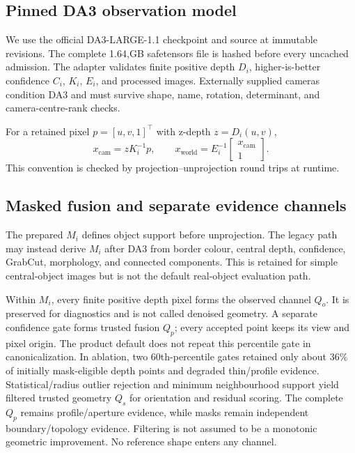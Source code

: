 \documentclass[10pt]{article}
\newcommand{\da}{DA3-LARGE-1.1}
\begin{document}
\subsection{Pinned DA3 observation model}

We use the official \da{} checkpoint and source at immutable revisions.  The
complete 1.64,GB safetensors file is hashed before every uncached admission.
The adapter validates finite positive depth $D_i$, higher-is-better confidence
$C_i$, $K_i$, $E_i$, and processed images.  Externally supplied cameras
condition DA3 and must survive shape, name, rotation, determinant, and
camera-centre-rank checks.

For a retained pixel $p=[u,v,1]^\top$ with z-depth $z=D_i(u,v)$,
\begin{equation}
  x_{\mathrm{cam}} = zK_i^{-1}p, \qquad
  x_{\mathrm{world}} = E_i^{-1}\begin{bmatrix}x_{\mathrm{cam}}\\1\end{bmatrix}.
\end{equation}
This convention is checked by projection--unprojection round trips at runtime.

\subsection{Masked fusion and separate evidence channels}

The prepared $M_i$ defines object support before unprojection.  The legacy path
may instead derive $M_i$ after DA3 from border colour, central depth, confidence,
GrabCut, morphology, and connected components.  This is retained for simple
central-object images but is not the default real-object evaluation path.

Within $M_i$, every finite positive depth pixel forms the observed channel
$Q_o$.  It is preserved for diagnostics and is not called denoised geometry.  A
separate confidence gate forms trusted fusion $Q_p$; every accepted point keeps
its view and pixel origin.  The product default does not repeat this percentile
gate in canonicalization.  In ablation, two 60th-percentile gates retained only
about 36\% of initially mask-eligible depth points and degraded thin/profile
evidence.  Statistical/radius outlier rejection and minimum neighbourhood
support yield filtered trusted geometry $Q_s$ for orientation and residual
scoring.  The complete $Q_p$ remains profile/aperture evidence, while masks
remain independent boundary/topology evidence.  Filtering is not assumed to be
a monotonic geometric improvement.  No reference shape enters any channel.
\end{document}
